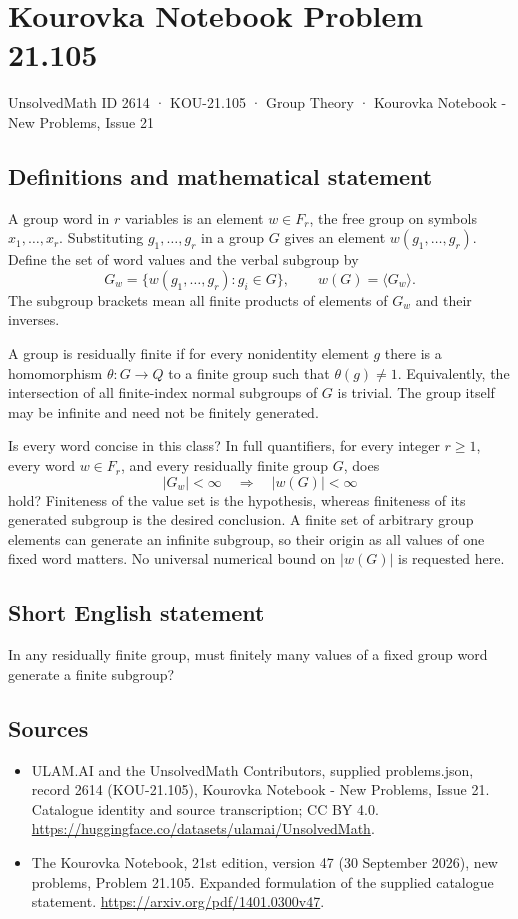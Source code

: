 \documentclass[11pt,a4paper]{article}
\begin{document}
\section*{Kourovka Notebook Problem 21.105}\label{2614}
{\small UnsolvedMath ID 2614 · KOU-21.105 · Group Theory · Kourovka Notebook - New Problems, Issue 21}
\subsection{Definitions and mathematical statement}
A group word in $r$ variables is an element $w\in F_r$, the free group on symbols $x_1,\ldots,x_r$. Substituting $g_1,\ldots,g_r$ in a group $G$ gives an element $w(g_1,\ldots,g_r)$. Define the set of word values and the verbal subgroup by
\[
 G_w=\{w(g_1,\ldots,g_r):g_i\in G\},\qquad
 w(G)=\langle G_w\rangle.
\]
The subgroup brackets mean all finite products of elements of $G_w$ and their inverses.

A group is residually finite if for every nonidentity element $g$ there is a homomorphism $\theta:G\to Q$ to a finite group such that $\theta(g)\ne1$. Equivalently, the intersection of all finite-index normal subgroups of $G$ is trivial. The group itself may be infinite and need not be finitely generated.

Is every word concise in this class? In full quantifiers, for every integer $r\ge1$, every word $w\in F_r$, and every residually finite group $G$, does
\[
 |G_w|<\infty\quad\Longrightarrow\quad |w(G)|<\infty
\]
hold? Finiteness of the value set is the hypothesis, whereas finiteness of its generated subgroup is the desired conclusion. A finite set of arbitrary group elements can generate an infinite subgroup, so their origin as all values of one fixed word matters. No universal numerical bound on $|w(G)|$ is requested here.
\subsection{Short English statement}
In any residually finite group, must finitely many values of a fixed group word generate a finite subgroup?
\subsection{Sources}
\begin{itemize}
\item[S1] ULAM.AI and the UnsolvedMath Contributors, supplied problems.json, record 2614 (KOU-21.105), Kourovka Notebook - New Problems, Issue 21. Catalogue identity and source transcription; CC BY 4.0.
\url{https://huggingface.co/datasets/ulamai/UnsolvedMath}.
\item[S2] The Kourovka Notebook, 21st edition, version 47 (30 September 2026), new problems, Problem 21.105. Expanded formulation of the supplied catalogue statement.
\url{https://arxiv.org/pdf/1401.0300v47}.
\end{itemize}
\end{document}
